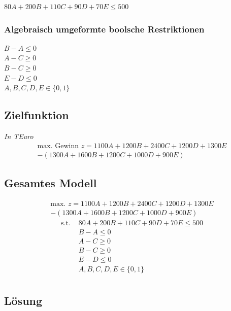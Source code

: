 \documentclass[a4paper,11pt]{article}
\begin{document}
$80A + 200B + 110C + 90D + 70E \le 500$

\subsubsection*{Algebraisch umgeformte boolsche Restriktionen}
$B - A \le 0$ \\
$A - C \ge 0$ \\
$B - C \ge 0$ \\
$E - D \le 0$ \\
$A, B, C, D, E \in \{0, 1\}$ \\


\subsection*{Zielfunktion}
\textit{In TEuro} \\
\begin{multline*}
\text{max. Gewinn } z = 1100A + 1200B + 2400C + 1200D + 1300E\\ - (1300A + 1600B + 1200C + 1000D + 900E)
\end{multline*}

\subsection*{Gesamtes Modell}
\begin{multline*}
    \text{max. } z = 1100A + 1200B + 2400C + 1200D + 1300E\\ - (1300A + 1600B + 1200C + 1000D + 900E)
\end{multline*}
\begin{align*}
\text{s.t. } & 80A + 200B + 110C + 90D + 70E \le 500 \\
& B - A \le 0 \\
& A - C \ge 0 \\
& B - C \ge 0 \\
& E - D \le 0 \\
& A, B, C, D, E \in \{0, 1\} \\
\end{align*}

\subsection*{Lösung}
\end{document}
